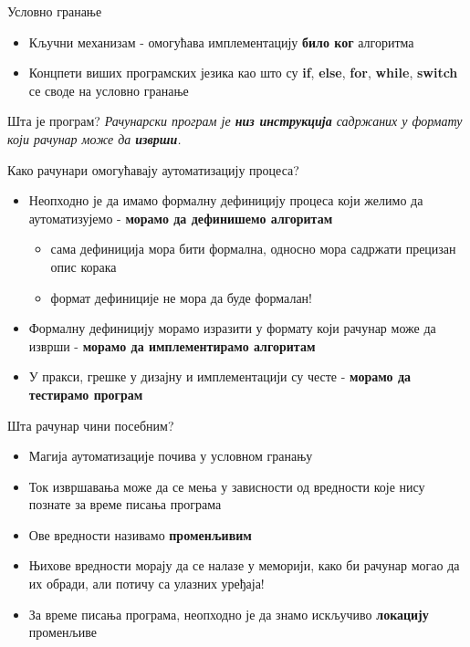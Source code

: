 \documentclass[xcolor=table]{beamer}
\begin{document}
    \begin{frame}{Условно гранање}
        \begin{itemize}
            \item Кључни механизам - омогућава имплементацију \textbf{било ког} алгоритма
            \item Концпети виших програмских језика као што су \textbf{if}, \textbf{else}, \textbf{for}, \textbf{while}, \textbf{switch} се своде на условно гранање
        \end{itemize}
    \end{frame}
    
    \begin{frame}{Шта је програм?}
        \textit{Рачунарски програм је \textbf{низ инструкција} садржаних у формату који рачунар може да \textbf{изврши}.}
    \end{frame}
    
    \begin{frame}{Како рачунари омогућавају аутоматизацију процеса?}
        \begin{itemize}
            \item Неопходно је да имамо формалну дефиницију процеса који желимо да аутоматизујемо - \textbf{морамо да дефинишемо алгоритам}
            \begin{itemize}
                \item сама дефиниција мора бити формална, односно мора садржати прецизан опис корака
                \item формат дефиниције не мора да буде формалан!
            \end{itemize}
            \item Формалну дефиницију морамо изразити у формату који рачунар може да изврши - \textbf{морамо да имплементирамо алгоритам}
            \item У пракси, грешке у дизајну и имплементацији су честе - \textbf{морамо да тестирамо програм}
        \end{itemize}
    \end{frame}
    
    \begin{frame}{Шта рачунар чини посебним?}
        \begin{itemize}
            \item Магија аутоматизације почива у условном гранању
            \item Ток извршавања може да се мења у зависности од вредности које нису познате за време писања програма
            \item Ове вредности називамо \textbf{променљивим}
            \item Њихове вредности морају да се налазе у меморији, како би рачунар могао да их обради, али потичу са улазних уређаја!
            \item За време писања програма, неопходно је да знамо искључиво \textbf{локацију} променљиве
        \end{itemize}
    \end{frame}
    
\end{document}
